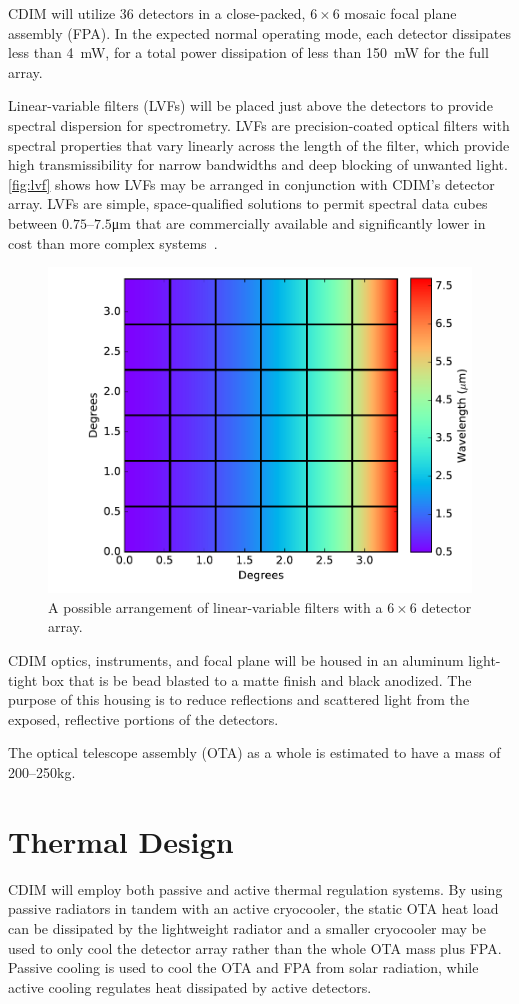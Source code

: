 \documentclass{ws-jai}
\begin{document}
CDIM will utilize 36 detectors in a close-packed, $6\times6$ mosaic focal plane assembly (FPA).
In the expected normal operating mode, each detector dissipates less than \SI{4}{\milli\watt}, for a total power dissipation of less than \SI{150}{\milli\watt} for the full array.

Linear-variable filters (LVFs) will be placed just above the detectors to provide spectral dispersion for spectrometry.
LVFs are precision-coated optical filters with spectral properties that vary linearly across the length of the filter, which provide high transmissibility for narrow bandwidths and deep blocking of unwanted light.
\autoref{fig:lvf} shows how LVFs may be arranged in conjunction with CDIM's detector array.
LVFs are simple, space-qualified solutions to permit spectral data cubes between $0.75$--$7.5$\si{\micro\meter} that are commercially available and significantly lower in cost than more complex systems~\cite{photonicsdotcom2016lvf}.
\begin{figure}[ht]
  \centering
  \includegraphics[width=.5\linewidth]{figs/lvf_positioning.pdf}
  \caption{A possible arrangement of linear-variable filters with a $6\times6$ detector array.}
\label{fig:lvf}
\end{figure}

CDIM optics, instruments, and focal plane will be housed in an aluminum light-tight box that is be bead blasted to a matte finish and black anodized.
The purpose of this housing is to reduce reflections and scattered light from the exposed, reflective portions of the detectors.

The optical telescope assembly (OTA) as a whole is estimated to have a mass of 200--250\si{\kilo\gram}.

\section{Thermal Design}
\label{sec:thermal}
CDIM will employ both passive and active thermal regulation systems.
By using passive radiators in tandem with an active cryocooler, the static OTA heat load can be dissipated by the lightweight radiator and a smaller cryocooler may be used to only cool the detector array rather than the whole OTA mass plus FPA.\@
Passive cooling is used to cool the OTA and FPA from solar radiation, while active cooling regulates heat dissipated by active detectors.
\end{document}
